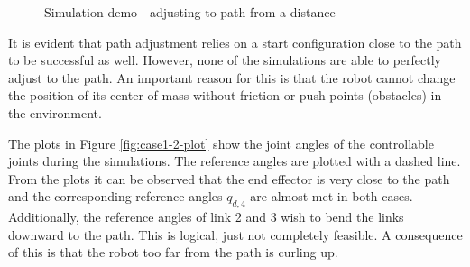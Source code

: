 \begin{figure}[H]
    
    \caption{Simulation demo - adjusting to path from a distance}
    \label{fig:case1-2b}
\end{figure}

It is evident that path adjustment relies on a start configuration close to the path to be successful as well. However, none of the simulations are able to perfectly adjust to the path. An important reason for this is that the robot cannot change the position of its center of mass without friction or push-points (obstacles) in the environment. 

The plots in Figure \ref{fig:case1-2-plot} show the joint angles of the controllable joints during the simulations. The reference angles are plotted with a dashed line.
From the plots it can be observed that the end effector is very close to the path and the corresponding reference angles $q_{d,4}$ are almost met in both cases. Additionally, the reference angles of link 2 and 3 wish to bend the links downward to the path. This is logical, just not completely feasible. A consequence of this is that the robot too far from the path is curling up. 

